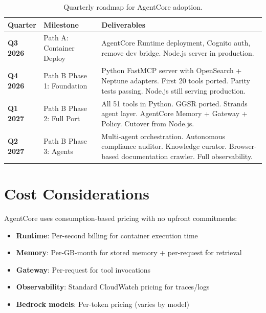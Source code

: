\documentclass[11pt,letterpaper]{article}
\begin{document}
\begin{table}[H]
\centering
\footnotesize
\begin{tabular}{@{}p{2cm}p{4cm}p{7cm}@{}}
\toprule
\textbf{Quarter} & \textbf{Milestone} & \textbf{Deliverables} \\
\midrule
\textbf{Q3 2026} & Path A: Container Deploy & AgentCore Runtime deployment, Cognito auth, remove dev bridge. Node.js server in production. \\
\midrule
\textbf{Q4 2026} & Path B Phase 1: Foundation & Python FastMCP server with OpenSearch + Neptune adapters. First 20 tools ported. Parity tests passing. Node.js still serving production. \\
\midrule
\textbf{Q1 2027} & Path B Phase 2: Full Port & All 51 tools in Python. GGSR ported. Strands agent layer. AgentCore Memory + Gateway + Policy. Cutover from Node.js. \\
\midrule
\textbf{Q2 2027} & Path B Phase 3: Agents & Multi-agent orchestration. Autonomous compliance auditor. Knowledge curator. Browser-based documentation crawler. Full observability. \\
\bottomrule
\end{tabular}
\caption{Quarterly roadmap for AgentCore adoption.}
\end{table}

\section{Cost Considerations}

AgentCore uses consumption-based pricing with no upfront commitments:

\begin{itemize}[noitemsep]
    \item \textbf{Runtime}: Per-second billing for container execution time
    \item \textbf{Memory}: Per-GB-month for stored memory + per-request for
          retrieval
    \item \textbf{Gateway}: Per-request for tool invocations
    \item \textbf{Observability}: Standard CloudWatch pricing for traces/logs
    \item \textbf{Bedrock models}: Per-token pricing (varies by model)
\end{itemize}
\end{document}
